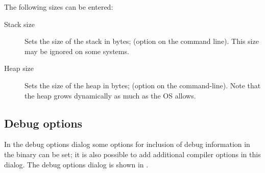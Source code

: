 
The following sizes can be entered:
\begin{description}
\item[Stack size] Sets the size of the stack in bytes;
(option  on the command line). This size may be ignored on some
systems.
\item[Heap size] Sets the size of the heap in bytes; (option  on
the command-line). Note that the heap grows dynamically as much as the OS
allows.
\end{description}

%
%
\subsection{Debug options}
\label{se:debugoptions}
In the debug options dialog some options for inclusion of debug information
in the binary can be set; it is also possible to add additional compiler
options in this dialog.
The debug options dialog is shown in .

